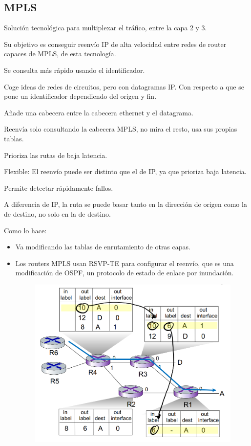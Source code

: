 \documentclass[12pt, twoside, openright]{report} %
\begin{document}
\subsection{MPLS}


        Solución tecnológica para multiplexar el tráfico, entre la capa
        2 y 3.

        Su objetivo es conseguir reenvío IP de alta velocidad entre
        redes de router capaces de MPLS, de esta tecnología.

        Se consulta más rápido usando el identificador.

        Coge ideas de redes de circuitos, pero con datagramas IP. Con
        respecto a que se pone un identificador dependiendo del origen y
        fin.

        Añade una cabecera entre la cabecera ethernet y el datagrama.

        Reenvía solo consultando la cabecera MPLS, no mira el resto, usa
        sus propias tablas.

        Prioriza las rutas de baja latencia.

        Flexible: El reenvío puede ser distinto que el de IP, ya que
        prioriza baja latencia.

        Permite detectar rápidamente fallos.

        A diferencia de IP, la ruta se puede basar tanto en la dirección
        de origen como la de destino, no solo en la de destino.

        Como lo hace:
        \begin{itemize}
      \item Va modificando las tablas de enrutamiento de otras capas.
      \item Los routers MPLS usan RSVP-TE para configurar el reenvío, que es una
        modificación de OSPF, un protocolo de estado de enlace por
        inundación.
        \begin{figure}[H]
          {\includegraphics[scale=.25]{Untitled 66.png}}
        \end{figure}
    \end{itemize}
\end{document}

